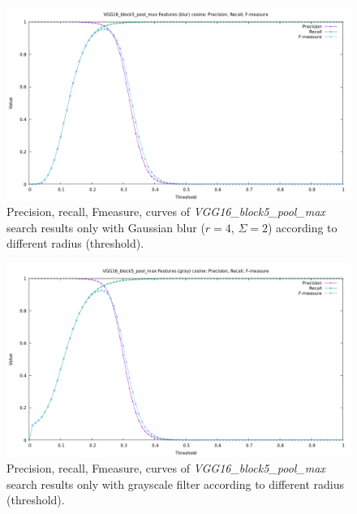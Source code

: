 \begin{figure}
	\centering
	\includegraphics[width=\textwidth]{img/benchmark_VGG16_block5_pool_max_cosine_blur.png}
	\caption{Precision, recall, Fmeasure, curves of \textit{VGG16\_block5\_pool\_max} search results only with Gaussian blur ($r=4$, $\Sigma=2$) according to different radius (threshold).}
	\label{fig:benchmark_VGG16_block5_pool_max_cosine_blur}
\end{figure}

\begin{figure}
	\centering
	\includegraphics[width=\textwidth]{img/benchmark_VGG16_block5_pool_max_cosine_gray.png}
	\caption{Precision, recall, Fmeasure, curves of \textit{VGG16\_block5\_pool\_max} search results only with grayscale filter according to different radius (threshold).}
	\label{fig:benchmark_VGG16_block5_pool_max_cosine_gray}
\end{figure}

